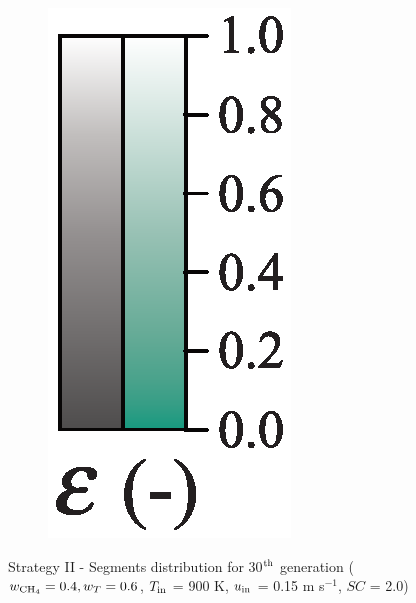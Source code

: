 \documentclass[preprint,12pt]{elsarticle}
\begin{document}
\begin{figure}
\begin{subfigure}[b]{0.1\textwidth}
     	\includegraphics[width=\textwidth]{segments_porosity.eps}
     \end{subfigure}
\caption{\label{fig:30L6040G1-TField} Strategy II - Segments distribution for 30$^{\rm{th}}$ generation ($w_{\rm{CH_4}} = 0.4, w_T = 0.6$, $T_{\rm{in}}$ = 900 K, $u_{\rm{in}}$ = 0.15 m s$^{-1}$, $SC$ = 2.0)}
\end{figure}
\end{document}
